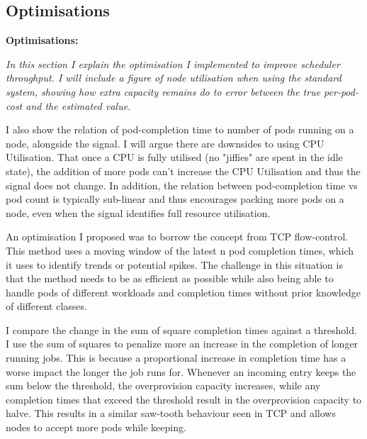 \subsection{Optimisations}
\begin{tcolorbox}[boxsep=0mm,left=2.5mm,right=2.5mm]
    \textbf{Optimisations:} {\em In this section I explain the optimisation I
    implemented to improve scheduler throughput. I will include a figure of node
    utilisation when using the standard system, showing how extra capacity
    remains do to error between the true per-pod-cost and the estimated value.

    I also show the relation of pod-completion time to number of pods running on
    a node, alongside the signal. I will argue there are downsides to using CPU
    Utilisation. That once a CPU is fully utilised (no "jiffies" are spent in the
    idle state), the addition of more pods can't increase the CPU Utilisation
    and thus the signal does not change. In addition, the relation between
    pod-completion time vs pod count is typically sub-linear and thus encourages
    packing more pods on a node, even when the signal identifies full resource
    utilisation.

    An optimisation I proposed was to borrow the concept from TCP flow-control.
    This method uses a moving window of the latest n pod completion times, which
    it uses to identify trends or potential spikes. The challenge in this
    situation is that the method needs to be as efficient as possible while also
    being able to handle pods of different workloads and completion times
    without prior knowledge of different classes.

    I compare the change in the sum of square completion times against a
    threshold. I use the sum of squares to penalize more an increase in the
    completion of longer running jobs. This is because a proportional increase
    in completion time has a worse impact the longer the job runs for. Whenever
    an incoming entry keeps the sum below the threshold, the overprovision
    capacity increases, while any completion times that exceed the threshold
    result in the overprovision capacity to halve. This results in a similar
    saw-tooth behaviour seen in TCP and allows nodes to accept more pods while
    keeping.
    }
\end{tcolorbox}


